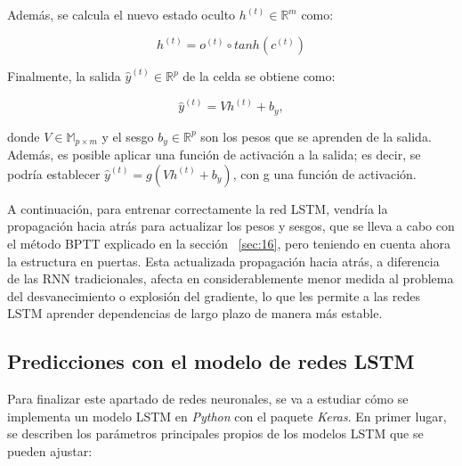 \documentclass[12pt,twoside]{article}
\begin{document}
Además, se calcula el nuevo estado oculto $h^{(t)} \in \mathbb{R}^m$ como:

\begin{equation}
h^{(t)} = o^{(t)} \circ tanh(c^{(t)})
\end{equation}

Finalmente, la salida $\hat{y}^{(t)} \in \mathbb{R}^p$ de la celda se obtiene como: 

\begin{equation}
\hat{y}^{(t)} = Vh^{(t)} + b_y,
\end{equation}

donde $V \in \mathbb{M}_{p \times m}$ y el sesgo $b_y \in \mathbb{R}^p$ son los pesos que se aprenden de la salida. Además, es posible aplicar una función de activación a la salida; es decir, se podría establecer $\hat{y}^{(t)} =g( Vh^{(t)} + b_y)$, con g una función de activación.


A continuación, para entrenar correctamente la red LSTM, vendría la propagación hacia atrás para actualizar los pesos y sesgos, que se lleva a cabo con el método BPTT explicado en la sección ~\ref{sec:16}, pero teniendo en cuenta ahora la estructura en puertas. Esta actualizada propagación hacia atrás, a diferencia de las RNN tradicionales, afecta en considerablemente menor medida al problema del desvanecimiento o explosión del gradiente, lo que les permite a las redes LSTM aprender dependencias de largo plazo de manera más estable.


\subsection{Predicciones con el modelo de redes LSTM}\label{sec:18}

Para finalizar este apartado de redes neuronales, se va a estudiar cómo se implementa un modelo LSTM en \textit{Python} con el paquete \textit{Keras}. En primer lugar, se describen los parámetros \cite{rnn4} principales propios de los modelos LSTM que se pueden ajustar:
\end{document}
